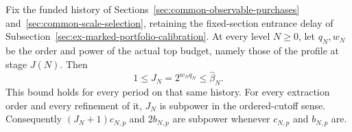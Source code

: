 \begin{lemma}\label{lem:actual-derivative-shift-payment}
Fix the funded history of Sections~\ref{sec:common-observable-purchases}
and~\ref{sec:common-scale-selection}, retaining the fixed-section
entrance delay of Subsection~\ref{sec:ex-marked-portfolio-calibration}.
At every level $N\ge0$, let $q_N,w_N$ be the order and power of the
actual top budget, namely those of the profile at stage $J(N)$.
Then
\[
                 1\le J_N=2^{w_Nq_N}\le\widehat\beta_N.
\]
This bound holds for every period on that same history. For every
extraction order and every refinement of it, $J_N$ is subpower in the
ordered-cutoff sense. Consequently $(J_N+1)c_{N,p}$ and $2b_{N,p}$
are subpower whenever $c_{N,p}$ and $b_{N,p}$ are.
\end{lemma}

